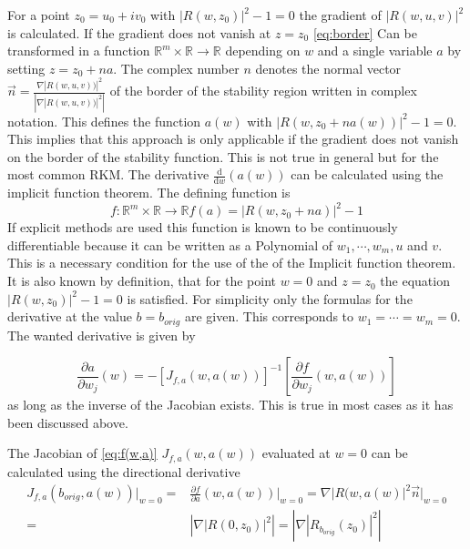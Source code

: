 \documentclass{article}
\begin{document}
For a point $z_0= u_0 +i v_0 $ 
with $ |R(w,z_0)|^2 -1 = 0 $ the gradient of
 $|R(w,u,v)|^2$ is calculated. 
If the gradient does not vanish at $z = z_0$ \eqref{eq:border} Can be transformed in a function $\mathbb{R}^m \times \mathbb{R} \rightarrow \mathbb{R}$ depending on $w$ and a single variable $a$ by setting $z = z_0 + n a$. The complex number $n$ denotes the normal vector $\vec{n} = \frac{\nabla |R(w,u,v))|^2}{\left| \nabla |R(w,u,v))|^2 \right|}$ of the border of the stability region written in complex notation. This defines the function $a(w)$ with $|R(w,z_0 + n a(w))|^2 -1 = 0$. 
This implies that this approach is only applicable if the gradient does not vanish on the border of the stability function. This is not true in general but for the most common RKM.
The derivative $\frac{\mathrm d}{\mathrm d w} (a(w))$ can be calculated using the implicit function theorem. The defining function is 
\begin{equation}\label{eq:f(w,a)}
f: \mathbb{R}^m \times \mathbb{R} \rightarrow \mathbb{R} f(a) = |R(w,z_0 + n a)|^2 -1 
\end{equation}
If explicit methods are used this function is known to be continuously differentiable because it can be written as a Polynomial of $w_1,\cdots,w_m,u$ and $v$. This is a necessary condition for the use of the of the Implicit function theorem. 
It is also known by definition, that for the point $w=0$ and $z = z_0$ the equation $ |R(w,z_0)|^2 -1 = 0 $ is satisfied.
For simplicity only the formulas for the derivative at the value $b = b_{orig}$ are given. This corresponds to $w_1 = \cdots = w_m = 0$.
The wanted derivative  is given by 

\begin{equation}
 \frac{\partial a}{\partial w_j} (w) =
 - \left[ J_{f,a}(w,a(w))  \right] ^{-1} 
   \left[ \frac{\partial f}{\partial w_j}(w,a(w)) \right]
\end{equation}
as long as the inverse of the Jacobian exists. This is true in most cases as it has been discussed above.

The Jacobian of \eqref{eq:f(w,a)} $J_{f,a}(w,a(w))$ evaluated at $w=0$ can be calculated using the directional derivative
\begin{align*}
 J_{f,a}(b_{orig},a(w)) \Big|_{w=0} =& 
 \frac{\partial f}{\partial a} (w,a(w)) \Big|_{w=0} = 
 \nabla |R(w,a(w)|^2 \vec{n} \Big|_{w=0} \\
=& \left| \nabla|R(0,z_0)|^2 \right| = \left| \nabla|R_{b_{orig}}(z_0)|^2 \right|
\end{align*} 
\end{document}
